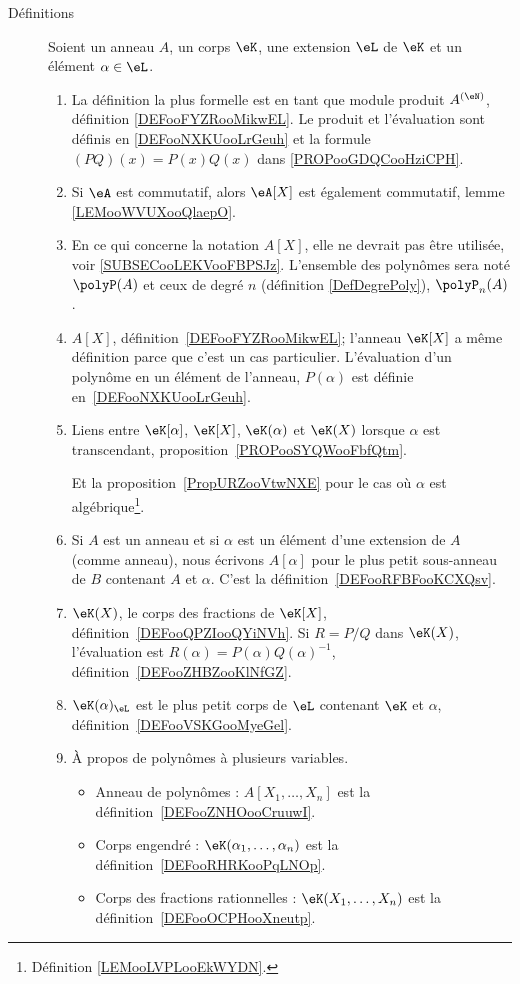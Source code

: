	\label{THEMEooPolynomes}

\begin{description}
	\item[Définitions]
		Soient un anneau \( A\), un corps \( \eK\), une extension \( \eL\) de \( \eK\) et un élément \( \alpha\in \eL\).
		\begin{enumerate}
			\item
			      La définition la plus formelle est en tant que module produit \( A^{(\eN)}\), définition \ref{DEFooFYZRooMikwEL}. Le produit et l'évaluation sont définis en \ref{DEFooNXKUooLrGeuh} et la formule \( (PQ)(x)=P(x)Q(x)\) dans \ref{PROPooGDQCooHziCPH}.
			\item
			      Si \( \eA\) est commutatif, alors \( \eA[X]\) est également commutatif, lemme \ref{LEMooWVUXooQlaepO}.
			\item
			      En ce qui concerne la notation \( A[X]\), elle ne devrait pas être utilisée, voir \ref{SUBSECooLEKVooFBPSJz}. L'ensemble des polynômes sera noté \( \polyP(A)\) et ceux de degré \( n\) (définition \ref{DefDegrePoly}), \( \polyP_n(A)\).
			\item
			      \( A[X]\), définition~\ref{DEFooFYZRooMikwEL}; l'anneau \( \eK[X]\) a même définition parce que c'est un cas particulier. L'évaluation d'un polynôme en un élément de l'anneau, \( P(\alpha)\) est définie en~\ref{DEFooNXKUooLrGeuh}.
			\item
			      Liens entre \( \eK[\alpha]\), \( \eK[X]\), \( \eK(\alpha)\) et \( \eK(X)\) lorsque \( \alpha\) est transcendant, proposition~\ref{PROPooSYQWooFbfQtm}.

			      Et la proposition~\ref{PropURZooVtwNXE} pour le cas où \( \alpha\) est algébrique\footnote{Définition \ref{LEMooLVPLooEkWYDN}.}.
			\item
			      Si \( A\) est un anneau et si \( \alpha\) est un élément d'une extension de \( A\) (comme anneau), nous écrivons \( A[\alpha]\) pour le plus petit sous-anneau de \( B\) contenant \( A\) et \( \alpha\). C'est la définition~\ref{DEFooRFBFooKCXQsv}.
			\item
			      \( \eK(X)\), le corps des fractions de \( \eK[X]\), définition~\ref{DEFooQPZIooQYiNVh}. Si \( R=P/Q\) dans \( \eK(X)\), l'évaluation est \( R(\alpha)=P(\alpha)Q(\alpha)^{-1}\), définition~\ref{DEFooZHBZooKlNfGZ}.
			\item
			      \( \eK(\alpha)_{\eL}\) est le plus petit corps de \( \eL\) contenant \( \eK\) et \( \alpha\), définition~\ref{DEFooVSKGooMyeGel}.
			\item
			      À propos de polynômes à plusieurs variables.
			      \begin{itemize}
				      \item Anneau de polynômes : \( A[X_1,\ldots, X_n]\) est la définition~\ref{DEFooZNHOooCruuwI}.
				      \item Corps engendré : \( \eK(\alpha_1,\ldots, \alpha_n)\) est la définition~\ref{DEFooRHRKooPqLNOp}.
				      \item Corps des fractions rationnelles : \( \eK(X_1,\ldots, X_n)\) est la définition~\ref{DEFooOCPHooXneutp}.
			      \end{itemize}
		\end{enumerate}


\end{description}
